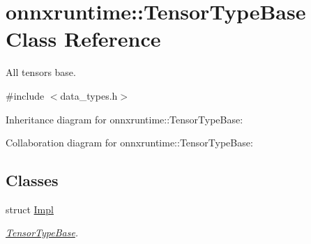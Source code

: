\hypertarget{classonnxruntime_1_1TensorTypeBase}{}\section{onnxruntime\+:\+:Tensor\+Type\+Base Class Reference}
\label{classonnxruntime_1_1TensorTypeBase}


All tensors base.  




{\ttfamily \#include $<$data\+\_\+types.\+h$>$}



Inheritance diagram for onnxruntime\+:\+:Tensor\+Type\+Base\+:


Collaboration diagram for onnxruntime\+:\+:Tensor\+Type\+Base\+:
\subsection*{Classes}
\begin{DoxyCompactItemize}
\item 
struct \mbox{\hyperlink{structonnxruntime_1_1TensorTypeBase_1_1Impl}{Impl}}
\begin{DoxyCompactList}\small\item\em \mbox{\hyperlink{classonnxruntime_1_1TensorTypeBase}{Tensor\+Type\+Base}}. \end{DoxyCompactList}\end{DoxyCompactItemize}
